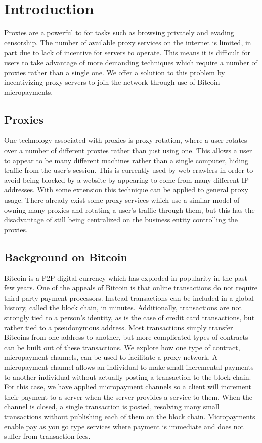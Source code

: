 \section{Introduction}
\label{sec:intro}

Proxies are a powerful to for tasks such as browsing privately and evading censorship. The number of available proxy services on the internet is limited, in part due to lack of incentive for servers to operate. This means it is difficult for users to take advantage of more demanding techniques which require a number of proxies rather than a single one. We offer a solution to this problem by incentivizing proxy servers to join the network through use of Bitcoin micropayments. 

\subsection{Proxies}

One technology associated with proxies is proxy rotation, where a user rotates over a number of different proxies rather than just using one. This allows a user to appear to be many different machines rather than a single computer, hiding traffic from the user's session. This is currently used by web crawlers in order to avoid being blocked by a website by appearing to come from many different IP addresses. With some extension this technique can be applied to general proxy usage. There already exist some proxy services which use a similar model of owning many proxies and rotating a user's traffic through them, but this has the disadvantage of still being centralized on the business entity controlling the proxies.

\subsection{Background on Bitcoin}

Bitcoin\cite{nakamoto2008bitcoin} is a P2P digital currency which has exploded in popularity in the past few years. One of the appeals of Bitcoin is that online transactions do not require third party payment processors. Instead transactions can be included in a global history, called the block chain, in minutes. Additionally, transactions are not strongly tied to a person's identity, as is the case of credit card transactions, but rather tied to a pseudonymous address. Most transactions simply transfer Bitcoins from one address to another, but more complicated types of contracts can be built out of these transactions. We explore how one type of contract, micropayment channels, can be used to facilitate a proxy network. A micropayment channel allows an individual to make small incremental payments to another individual without actually posting a transaction to the block chain. For this case, we have applied micropayment channels so a client will increment their payment to a server when the server provides a service to them. When the channel is closed, a single transaction is posted, resolving many small transactions without publishing each of them on the block chain. Micropayments enable pay as you go type services where payment is immediate and does not suffer from transaction fees.

